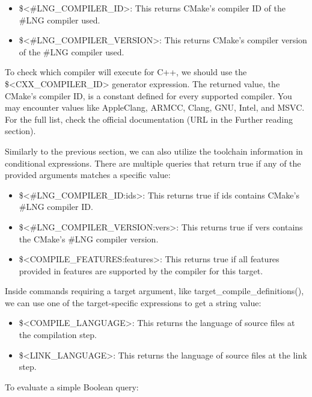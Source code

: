 \begin{itemize}
\item
\$<\#LNG\_COMPILER\_ID>: This returns CMake’s compiler ID of the \#LNG compiler used.

\item
\$<\#LNG\_COMPILER\_VERSION>: This returns CMake’s compiler version of the \#LNG compiler used.
\end{itemize}

To check which compiler will execute for C++, we should use the \$<CXX\_COMPILER\_ID> generator expression. The returned value, the CMake’s compiler ID, is a constant defined for every supported compiler. You may encounter values like AppleClang, ARMCC, Clang, GNU, Intel, and MSVC. For the full list, check the official documentation (URL in the Further reading section).

Similarly to the previous section, we can also utilize the toolchain information in conditional expressions. There are multiple queries that return true if any of the provided arguments matches a specific value:

\begin{itemize}
\item
\$<\#LNG\_COMPILER\_ID:ids>: This returns true if ids contains CMake’s \#LNG compiler ID.

\item
\$<\#LNG\_COMPILER\_VERSION:vers>: This returns true if vers contains the CMake’s \#LNG compiler version.

\item
\$<COMPILE\_FEATURES:features>: This returns true if all features provided in features are supported by the compiler for this target.
\end{itemize}

Inside commands requiring a target argument, like target\_compile\_definitions(), we can use one of the target-specific expressions to get a string value:

\begin{itemize}
\item
\$<COMPILE\_LANGUAGE>: This returns the language of source files at the compilation step.

\item
\$<LINK\_LANGUAGE>: This returns the language of source files at the link step.
\end{itemize}

To evaluate a simple Boolean query:

